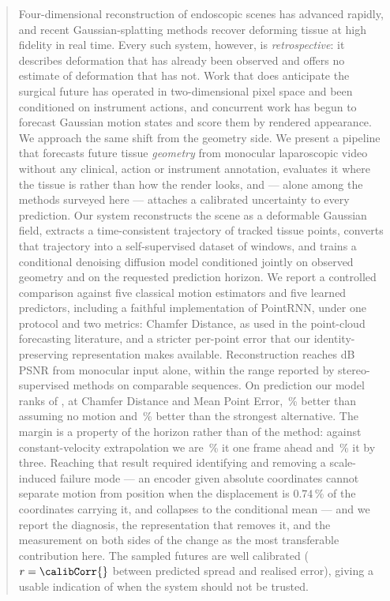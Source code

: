 \documentclass[conference]{IEEEtran}
\begin{document}
\begin{abstract}
Four-dimensional reconstruction of endoscopic scenes has advanced rapidly, and
recent Gaussian-splatting methods recover deforming tissue at high fidelity in
real time. Every such system, however, is \emph{retrospective}: it describes
deformation that has already been observed and offers no estimate of deformation
that has not. Work that does anticipate the surgical future has operated in
two-dimensional pixel space and been conditioned on instrument actions, and
concurrent work has begun to forecast Gaussian motion states and score them by
rendered appearance. We approach the same shift from the geometry side. We present a
pipeline that forecasts future tissue \emph{geometry} from monocular laparoscopic
video without any clinical, action or instrument annotation, evaluates it where the
tissue is rather than how the render looks, and --- alone among the methods surveyed
here --- attaches a calibrated uncertainty to every prediction. Our system reconstructs the scene as a deformable Gaussian field,
extracts a time-consistent trajectory of \numAnchors{} tracked tissue points,
converts that trajectory into a self-supervised dataset of \numTrainWindows{}
windows, and trains a conditional denoising diffusion model conditioned jointly on
observed geometry and on the requested prediction horizon. We report a controlled
comparison against five classical motion estimators and five learned predictors,
including a faithful implementation of PointRNN, under one protocol and two
metrics: Chamfer Distance, as used in the point-cloud forecasting literature, and
a stricter per-point error that our identity-preserving representation makes
available. Reconstruction reaches \reconPSNR{} dB PSNR from monocular input alone,
within the range reported by stereo-supervised methods on comparable sequences. On
prediction our model ranks \oursRank{} of \nMethods{}, at \oursCD{} Chamfer Distance
and \oursMPE{} Mean Point Error, \gainOverStatic{}\,\% better than assuming no motion
and \gainOverNext{}\,\% better than the strongest alternative. The margin is a
property of the horizon rather than of the method: against constant-velocity
extrapolation we are \cvMarginOne{}\,\% \cvVerdictOne{} it one frame ahead and
\cvMarginThree{}\,\% \cvVerdictThree{} it by three. Reaching that result required identifying and removing a scale-induced failure
mode --- an encoder given absolute coordinates cannot separate motion from position
when the displacement is $0.74\,\%$ of the coordinates carrying it, and collapses to
the conditional mean --- and we report the diagnosis, the representation that removes
it, and the measurement on both sides of the change as the most transferable
contribution here. The sampled futures are well calibrated
($r=\calibCorr{}$ between predicted spread and realised error), giving a usable
indication of when the system should not be trusted.
\end{abstract}
\end{document}
